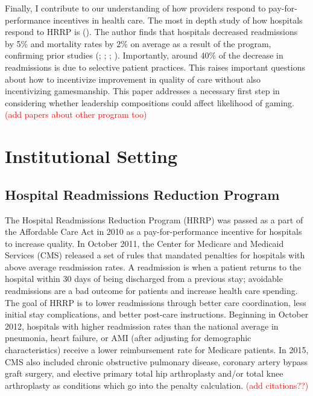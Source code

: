 \documentclass[12pt]{article}
\begin{document}
    Finally, I contribute to our understanding of how providers respond to pay-for-performance incentives in health care. The most in depth study of how hospitals respond to HRRP is \citeauthor{gupta2021impacts} (\citeyear{gupta2021impacts}). The author finds that hospitals decreased readmissions by 5\% and mortality rates by 2\% on average as a result of the program, confirming prior studies (\cite{mellor2017does}; \cite{ziedan2018essays}; \cite{ody2019decreases}; \cite{gupta2021impacts}). Importantly, around 40\% of the decrease in readmissions is due to selective patient practices. This raises important questions about how to incentivize improvement in quality of care without also incentivizing gamesmanship. This paper addresses a necessary first step in considering whether leadership compositions could affect likelihood of gaming. \textcolor{red}{(add papers about other program too)}

    

    \section{Institutional Setting}

    \subsection{Hospital Readmissions Reduction Program}\label{sec:hrrp}

    The Hospital Readmissions Reduction Program (HRRP) was passed as a part of the Affordable Care Act in 2010 as a pay-for-performance incentive for hospitals to increase quality. In October 2011, the Center for Medicare and Medicaid Services (CMS) released a set of rules that mandated penalties for hospitals with above average readmission rates. A readmission is when a patient returns to the hospital within 30 days of being discharged from a previous stay; avoidable readmissions are a bad outcome for patients and increase health care spending. The goal of HRRP is to lower readmissions through better care coordination, less initial stay complications, and better post-care instructions. Beginning in October 2012, hospitals with higher readmission rates than the national average in pneumonia, heart failure, or AMI (after adjusting for demographic characteristics) receive a lower reimbursement rate for Medicare patients. In 2015, CMS also included chronic obstructive pulmonary disease, coronary artery bypass graft surgery, and elective primary total hip arthroplasty and/or total knee arthroplasty as conditions which go into the penalty calculation. \textcolor{red}{(add citations??)}
    
\end{document}
